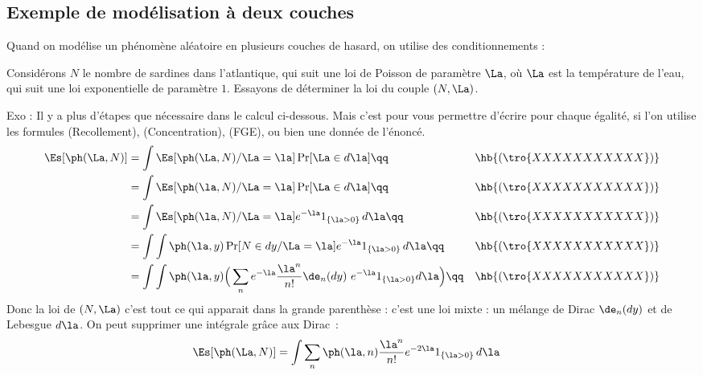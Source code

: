 \documentclass{article}
\begin{document}
 
 

\subsection{Exemple de modélisation à deux couches}

Quand on modélise un phénomène aléatoire en plusieurs couches de hasard, on utilise  des conditionnements : 

Considérons $N$ le nombre de sardines dans l'atlantique, qui suit une loi de Poisson de paramètre $\La$, où $\La$ est la température de l'eau, qui suit une loi exponentielle de paramètre $1$.    Essayons de déterminer la loi du couple $(N ,\La)$. 

Exo : Il y a plus d'étapes que nécessaire dans le calcul ci-dessous. Mais c'est pour vous permettre d'écrire  pour chaque égalité, si l'on utilise les formules (Recollement),  (Concentration),    (FGE), ou bien une donnée de l'énoncé.
\begin{alignat*}{2}
\Es[\ph(\La ,N )]& = \int  \Es[\ph(\La,N) / \La = \la   ] \Pr[\La \in d\la ]\qq &&    \hb{(\tro{XXXXXXXXXXX})}  \\
& = \int  \Es[\ph( \la  , N )  / \La=\la   ]  \Pr[\La \in d\la ] \qq &&    \hb{(\tro{XXXXXXXXXXX})}   \\ 
& = \int  \Es[\ph( \la  , N )  / \La=\la   ]   e^{- \la } 1_{\{\la >0\}}\, d\la\qq &&    \hb{(\tro{XXXXXXXXXXX})}   \\ 
& = \int \int   \ph( \la  , y )   \Pr[N\in dy / \La=\la]   e^{- \la } 1_{\{\la >0\}}\, d\la \qq &&    \hb{(\tro{XXXXXXXXXXX})}  \\ 
& = \int \int   \ph( \la  , y )     \Big( \sum_n  e^{- \la }  \frac  {\la^n}{n !}       \de_n(dy)      \     e^{- \la } 1_{\{\la >0\}}    d\la  \Big) \qq &&    \hb{(\tro{XXXXXXXXXXX})}    
\end{alignat*}
Donc la loi de $(N,\La)$ c'est tout ce qui apparait dans la grande parenthèse : c'est une loi mixte :  un mélange de Dirac $\de_n(dy)$ et de Lebesgue $d\la$.  On peut supprimer une intégrale grâce aux Dirac~:
\begin{alignat*}{1}
\Es[\ph(\La, N )] & = \int  \sum_n   \ph( \la,  n  )      \frac  {\la^n}{n !}       e^{- 2\la } 1_{\{\la >0\}}\, d\la    
\end{alignat*}
\end{document}
